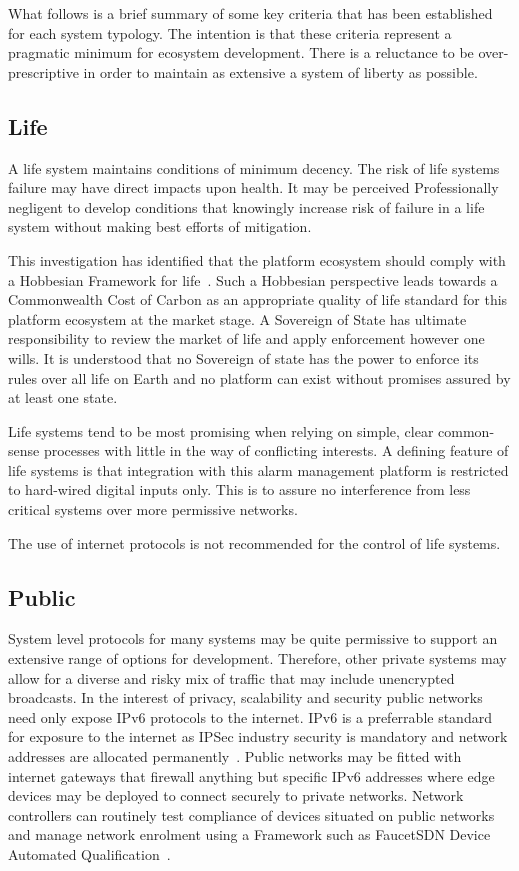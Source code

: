\documentclass[11pt, oneside]{article}   	%
\begin{document}
What follows is a brief summary of some key criteria that has been established for each system typology.
The intention is that these criteria represent a pragmatic minimum for ecosystem development.
There is a reluctance to be over-prescriptive in order to maintain as extensive a system of liberty as possible.

\subsection{Life}
A life system maintains conditions of minimum decency.
The risk of life systems failure may have direct impacts upon health.
It may be perceived Professionally negligent to develop conditions that knowingly increase risk of failure in a life system without making best efforts of mitigation.\

This investigation has identified that the platform ecosystem should comply with a Hobbesian Framework for life~\cite{th1}.
Such a Hobbesian perspective leads towards a Commonwealth Cost of Carbon as an appropriate quality of life standard for this platform ecosystem at the market stage.
A Sovereign of State has ultimate responsibility to review the market of life and apply enforcement however one wills.
It is understood that no Sovereign of state has the power to enforce its rules over all life on Earth and no platform can exist without promises assured by at least one state.\

Life systems tend to be most promising when relying on simple, clear common-sense processes with little in the way of conflicting interests.
A defining feature of life systems is that integration with this alarm management platform is restricted to hard-wired digital inputs only.
This is to assure no interference from less critical systems over more permissive networks.\

The use of internet protocols is not recommended for the control of life systems.\

\subsection{Public}
System level protocols for many systems may be quite permissive to support an extensive range of options for development.
Therefore, other private systems may allow for a diverse and risky mix of traffic that may include unencrypted broadcasts.
In the interest of privacy, scalability and security public networks need only expose IPv6 protocols to the internet.
IPv6 is a preferrable standard for exposure to the internet as IPSec industry security is mandatory and network addresses are allocated permanently~\cite{ipv6}.
Public networks may be fitted with internet gateways that firewall anything but specific IPv6 addresses where edge devices may be deployed to connect securely to private networks.
Network controllers can routinely test compliance of devices situated on public networks and manage network enrolment using a Framework such as FaucetSDN Device Automated Qualification~\cite{daq1}.\
\end{document}
